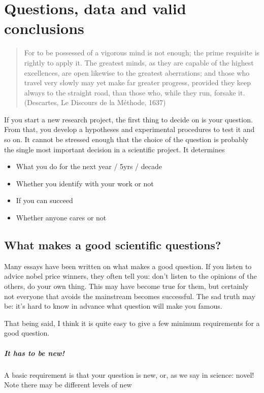 \documentclass{tufte-book}
\begin{document}
\chapter{Questions, data and valid conclusions}

\begin{quote}
For to be possessed of a vigorous mind is not enough; the prime requisite is rightly to apply it. The greatest minds, as they are capable of the highest excellences, are open likewise to the greatest aberrations; and those who travel very slowly may yet make far greater progress, provided they keep always to the straight road, than those who, while they run, forsake it. (Descartes, Le Discours de la Méthode, 1637)
\end{quote}


If you start a new research project, the first thing to decide on is your question. From that, you develop a hypotheses and experimental procedures to test it and so on. It cannot be stressed enough that the choice of the question is probably the single most important decision in a scientific project. It determines

\begin{itemize}
\item What you do for the next year / 5yrs / decade
\item Whether you identify with your work or not
\item If you can succeed
\item Whether anyone cares or not
\end{itemize}


\section{What makes a good scientific questions?}

Many essays have been written on what makes a good question. If you listen to advice nobel price winners, they often tell you: don't listen to the opinions of the others, do your own thing. This may have become true for them, but certainly not everyone that avoids the mainstream becomes successful. The sad truth may be: it's hard to know in advance what question will make you famous.

That being said, I think it is quite easy to give a few minimum requirements for a good question.


\paragraph{It has to be new!} A basic requirement is that your question is new, or, as we say in science: novel! Note there may be different levels of new
\end{document}
